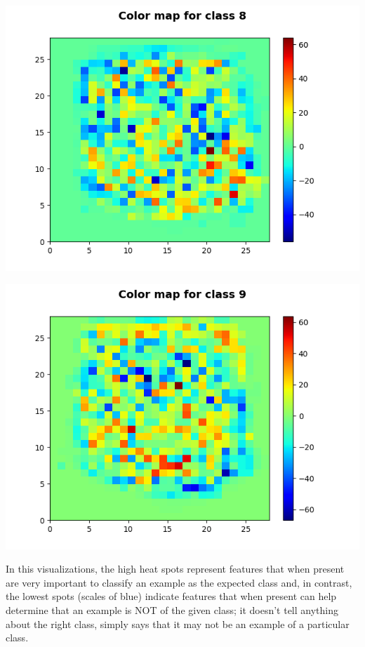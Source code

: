\documentclass[11pt]{article}
\begin{document}
\begin{center}
\includegraphics[scale=0.80]{part1.ec2/digit8.png}
\end{center}

\begin{center}
\includegraphics[scale=0.80]{part1.ec2/digit9.png}
\end{center}

In this visualizations, the high heat spots represent features that when present are very important to classify an example as the expected class and, in contrast, the lowest spots (scales of blue) indicate features that when present can help determine that an example is NOT of the given class; it doesn't tell anything about the right class, simply says that it may not be an example of a particular class.\\
\end{document}
